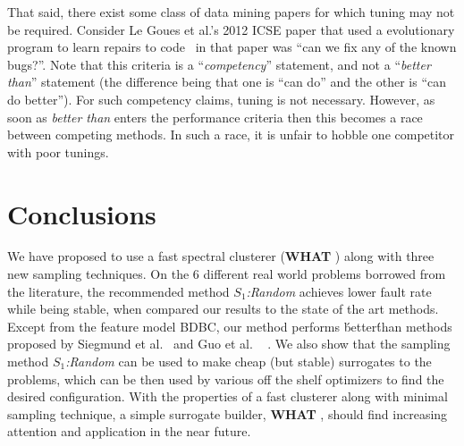 \documentclass{sig-alternative}
\newcommand{\what}{{\bf WHAT }}
\begin{document}
That said, there exist some class of data mining papers for which
tuning may not be required. Consider  Le Goues et al.'s 2012
ICSE paper that used a evolutionary program to learn
repairs to code~
in that paper was ``can we fix any of the known bugs?''. Note
that this criteria is a ``{\em competency}'' statement, and
not a ``{\em better than}'' statement (the difference being that
one is 
``can do'' and the other is ``can do better''). For such
competency claims, tuning is not necessary. However, as soon
as {\em better than} enters the performance criteria then this
becomes a race between competing methods. In such a race,
it is unfair to hobble one competitor with poor tunings.



\section{Conclusions}

We have proposed to use a fast spectral clusterer (\what) along with three new sampling techniques. On the 6 different real world problems borrowed from the literature, the recommended method \textit{$S_1$:Random} achieves lower fault rate while being stable, when compared our results to the state of the art methods. 
Except from the feature model BDBC, our method performs \'better\' than methods proposed by Siegmund et al.  ~\cite{siegmund2012predicting}and Guo et al. ~\cite{guo2013variability} . We also show that the sampling method \textit{$S_1$:Random} can be used to make cheap (but stable) surrogates to the problems, which can be then used by various off the shelf optimizers to find the desired configuration. 
With the properties of  a fast clusterer along with minimal sampling technique, a simple surrogate builder, \what, should find increasing attention and application in the near future.



\vspace*{0.5mm}
 
 


\balance
  
\end{document}
